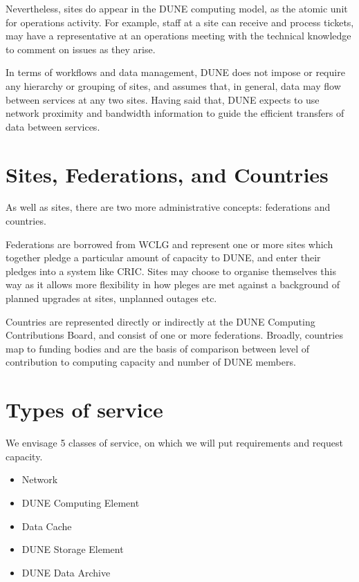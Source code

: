 \documentclass[../main-v1.tex]{subfiles}
\begin{document}
Nevertheless, sites do appear in the DUNE computing model, as the atomic unit for operations activity. For example, staff at a site can receive and process tickets, may have a representative at an operations meeting with the technical knowledge to comment on issues as they arise.

In terms of workflows and data management, DUNE does not impose or require any hierarchy or grouping of sites, and assumes that, in general, data may flow between services at any two sites. Having said that, DUNE expects to use network proximity and bandwidth information to guide the efficient transfers of data between services. 

\section{Sites, Federations, and Countries}
\label{sec:cm:federations}

As well as sites, there are two more administrative concepts: federations and countries.

Federations are borrowed from WCLG and represent one or more sites which together pledge a particular amount of capacity to DUNE, and enter their pledges into a system like CRIC. Sites may choose to organise themselves this way as it allows more flexibility in how pleges are met against a background of planned upgrades at sites, unplanned outages etc. 

Countries are represented directly or indirectly at the DUNE Computing Contributions Board, and consist of one or more federations. Broadly, countries map to funding bodies and are the basis of comparison between level of contribution to computing capacity and number of DUNE members.




\section{Types of service}
\label{sec:cm:types_of_service}

We envisage 5 classes of service, on which we will put requirements and request capacity.

\begin{itemize}
    \item Network
    \item DUNE Computing Element
    \item Data Cache
    \item DUNE Storage Element
    \item DUNE Data Archive
\end{itemize}
\end{document}
